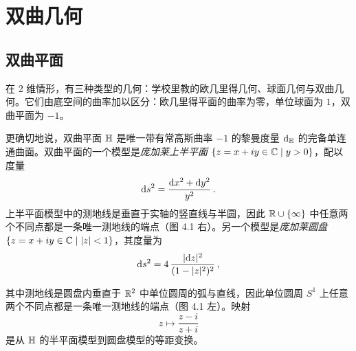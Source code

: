 
\chapter{双曲几何}


\section{双曲平面}

在 2 维情形，有三种类型的几何：学校里教的欧几里得几何、球面几何与双曲几何。它们由底空间的曲率加以区分：欧几里得平面的曲率为零，单位球面为 $1$，双曲平面为 $-1$。

更确切地说，双曲平面 $\mathbb{H}$ 是唯一带有常高斯曲率 $-1$ 的黎曼度量 $\mathrm{d}_{\mathbb{H}}$ 的完备单连通曲面。双曲平面的一个模型是\emph{庞加莱上半平面} $\{z=x+iy\in\mathbb{C} \mid y>0\}$，配以度量
\[
\mathrm{d} s^2=\frac{\mathrm{d} x^2+\mathrm{d} y^2}{y^2}\,.
\]
上半平面模型中的测地线是垂直于实轴的竖直线与半圆，因此 $\mathbb{R}\cup\{\infty\}$ 中任意两个不同点都是一条唯一测地线的端点（图 4.1 右）。另一个模型是\emph{庞加莱圆盘} $\{z=x+iy\in\mathbb{C} \mid |z|<1\}$，其度量为
\[
\mathrm{d} s^2=4\,\frac{|\mathrm{d} z|^2}{(1-|z|^2)^2}\,,
\]

其中测地线是圆盘内垂直于 $\mathbb{R}^2$ 中单位圆周的弧与直线，因此单位圆周 $S^1$ 上任意两个不同点都是一条唯一测地线的端点（图 4.1 左）。映射
\begin{equation}
z\longmapsto \frac{z-i}{z+i} \tag{4.1}
\end{equation}
是从 $\mathbb{H}$ 的半平面模型到圆盘模型的等距变换。


